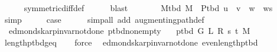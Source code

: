 \begin{isabellebody}
\ \ \ \ \isamarkupfalse%
\ symmetric{\isacharunderscore}{\kern0pt}diff{\isacharunderscore}{\kern0pt}def\isanewline
\ \ \ \ \isamarkupfalse%
\ blast\isanewline
\ \ \isamarkupfalse%
\ \isamarkupfalse%
\ {\isachardoublequoteopen}{\isachardot}{\kern0pt}{\isachardot}{\kern0pt}{\isachardot}{\kern0pt}\ {\isacharequal}{\kern0pt}\ M{\isacharunderscore}{\kern0pt}tbd\ M\ {\isasymoplus}\ P{\isacharunderscore}{\kern0pt}tbd\ {\isacharparenleft}{\kern0pt}u\ {\isacharhash}{\kern0pt}\ v\ {\isacharhash}{\kern0pt}\ w\ {\isacharhash}{\kern0pt}\ ws{\isacharparenright}{\kern0pt}{\isachardoublequoteclose}\isanewline
\ \ \ \ \isamarkupfalse%
\ simp\isanewline
\ \ \isamarkupfalse%
\ \isamarkupfalse%
\ {\isacharquery}{\kern0pt}case\isanewline
\ \ \ \ \isacommand{{\isachardot}{\kern0pt}}\isamarkupfalse%
\isanewline
{}\isamarkupfalse%
\ {\isacharparenleft}{\kern0pt}simp{\isacharunderscore}{\kern0pt}all\ add{\isacharcolon}{\kern0pt}\ augmenting{\isacharunderscore}{\kern0pt}path{\isacharunderscore}{\kern0pt}def{\isacharparenright}{\kern0pt}%
\endisatagproof
{\isafoldproof}%
%
\isadelimproof
\isanewline
%
\endisadelimproof
%
\isadeliminvisible
\isanewline
%
\endisadeliminvisible
%
\isataginvisible
{}\isamarkupfalse%
\ {\isacharparenleft}{\kern0pt}\ edmonds{\isacharunderscore}{\kern0pt}karp{\isacharunderscore}{\kern0pt}invar{\isacharunderscore}{\kern0pt}not{\isacharunderscore}{\kern0pt}done{\isacharunderscore}{\kern0pt}{}{\isacharparenright}{\kern0pt}\ p{\isacharunderscore}{\kern0pt}tbd{\isacharunderscore}{\kern0pt}non{\isacharunderscore}{\kern0pt}empty{\isacharcolon}{\kern0pt}\isanewline
\ \ \ {\isachardoublequoteopen}p{\isacharunderscore}{\kern0pt}tbd\ G\ L\ R\ s\ t\ M\ {\isasymnoteq}\ {\isacharbrackleft}{\kern0pt}{\isacharbrackright}{\kern0pt}{\isachardoublequoteclose}%
\endisataginvisible
{\isafoldinvisible}%
%
\isadeliminvisible
\isanewline
%
\endisadeliminvisible
%
\isadelimproof
\ \ %
\endisadelimproof
%
\isatagproof
{}\isamarkupfalse%
\ length{\isacharunderscore}{\kern0pt}p{\isacharunderscore}{\kern0pt}tbd{\isacharunderscore}{\kern0pt}geq{\isacharunderscore}{\kern0pt}{}\isanewline
\ \ \isamarkupfalse%
\ force%
\endisatagproof
{\isafoldproof}%
%
\isadelimproof
\isanewline
%
\endisadelimproof
%
\isadeliminvisible
\isanewline
%
\endisadeliminvisible
%
\isataginvisible
{}\isamarkupfalse%
\ {\isacharparenleft}{\kern0pt}\ edmonds{\isacharunderscore}{\kern0pt}karp{\isacharunderscore}{\kern0pt}invar{\isacharunderscore}{\kern0pt}not{\isacharunderscore}{\kern0pt}done{\isacharunderscore}{\kern0pt}{}{\isacharparenright}{\kern0pt}\ even{\isacharunderscore}{\kern0pt}length{\isacharunderscore}{\kern0pt}p{\isacharunderscore}{\kern0pt}tbd{\isacharcolon}{\kern0pt}\isanewline

\end{isabellebody}
